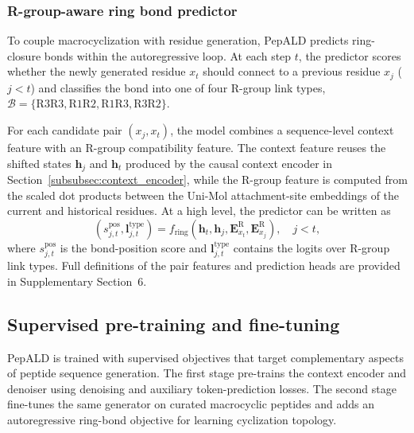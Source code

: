 \begin{methods}
\subsubsection{R-group-aware ring bond predictor}\label{subsec:ring}

To couple macrocyclization with residue generation, PepALD predicts ring-closure bonds within the autoregressive loop.
At each step $t$, the predictor scores whether the newly generated residue $x_t$ should connect to a previous residue $x_j$ ($j<t$) and classifies the bond into one of four R-group link types, $\mathcal{B}=\{\mathrm{R3R3},\mathrm{R1R2},\mathrm{R1R3},\mathrm{R3R2}\}$.

For each candidate pair $(x_j,x_t)$, the model combines a sequence-level context feature with an R-group compatibility feature.
The context feature reuses the shifted states $\mathbf{h}_j$ and $\mathbf{h}_t$ produced by the causal context encoder in Section~\ref{subsubsec:context_encoder}, while the R-group feature is computed from the scaled dot products between the Uni-Mol attachment-site embeddings of the current and historical residues.
At a high level, the predictor can be written as
\begin{equation}
\left(s_{j,t}^{\mathrm{pos}},\mathbf{l}_{j,t}^{\mathrm{type}}\right)
=
f_{\mathrm{ring}}\!\left(
\mathbf{h}_t,\mathbf{h}_j,
\mathbf{E}_{x_t}^{\mathrm{R}},\mathbf{E}_{x_j}^{\mathrm{R}}
\right),
\quad j<t,
\label{eq:ring_predictor_summary}
\end{equation}
where $s_{j,t}^{\mathrm{pos}}$ is the bond-position score and $\mathbf{l}_{j,t}^{\mathrm{type}}$ contains the logits over R-group link types.
Full definitions of the pair features and prediction heads are provided in Supplementary Section~6.


\subsection{Supervised pre-training and fine-tuning}\label{subsec:training}

PepALD is trained with supervised objectives that target complementary aspects of peptide sequence generation.
The first stage pre-trains the context encoder and denoiser using denoising and auxiliary token-prediction losses.
The second stage fine-tunes the same generator on curated macrocyclic peptides and adds an autoregressive ring-bond objective for learning cyclization topology.


\end{methods}
